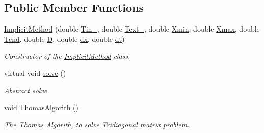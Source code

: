 \subsection*{Public Member Functions}
\begin{DoxyCompactItemize}
\item 
\hyperlink{class_implicit_method_aa1169b777d7e6406f2a754da0fa9b515}{Implicit\+Method} (double \hyperlink{class_heat_conduction_a2487010bf67582643ff59c0c5167725e}{Tin\+\_}, double \hyperlink{class_heat_conduction_aeb50fb3189fd6545f765ef73c9be7889}{Text\+\_}, double \hyperlink{class_heat_conduction_a6ccf374e13ab91b2403db617c9e7a8f0}{Xmin}, double \hyperlink{class_heat_conduction_a187dd05134300536dd9b5418e2957e9a}{Xmax}, double \hyperlink{class_heat_conduction_ab1d00caf79f4c04b420189eaf7c666e1}{Tend}, double \hyperlink{class_heat_conduction_a197d8aa3aa8619edaa640c243bdfc793}{D}, double \hyperlink{class_heat_conduction_a208bf1f475147b07a1f7d28533d78d9c}{dx}, double \hyperlink{class_heat_conduction_a7a7d5f6631039781c80b8c0c60e540e6}{dt})
\begin{DoxyCompactList}\small\item\em Constructor of the \hyperlink{class_implicit_method}{Implicit\+Method} class. \end{DoxyCompactList}\item 
virtual void \hyperlink{class_implicit_method_ae06909ac3cde1ae9fb216501c852e22c}{solve} ()
\begin{DoxyCompactList}\small\item\em Abstract solve. \end{DoxyCompactList}\item 
void \hyperlink{class_implicit_method_ae06f9aa9d076738cdcb7cd967d453795}{Thomas\+Algorith} ()
\begin{DoxyCompactList}\small\item\em The Thomas Algorith, to solve Tridiagonal matrix problem. \end{DoxyCompactList}\end{DoxyCompactItemize}
